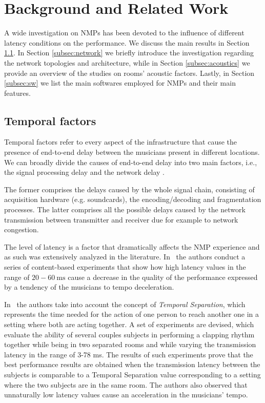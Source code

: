 \section{Background and Related Work}\label{sec:background}
A wide investigation on NMPs has been devoted to the influence of different latency conditions on the performance. We discuss the main results in Section \ref{subsec:temporal}. In Section \ref{subsec:network} we briefly introduce the investigation regarding the network topologies and architecture, while in Section \ref{subsec:acoustics} we provide an overview of the studies on rooms' acoustic factors. Lastly, in Section \ref{subsec:sw} we list the main softwares employed for NMPs and their main features.

\subsection{Temporal factors}\label{subsec:temporal}
Temporal factors refer to every aspect of the infrastructure that cause the presence of end-to-end delay between the musicians present in different locations. We can broadly divide the causes of end-to-end delay into two main factors, i.e., the signal processing delay and the network delay \cite{Lakiotakis}. 

The former comprises the delays caused by the whole signal chain, consisting of acquisition hardware (e.g. soundcards), the encoding/decoding and fragmentation processes. The latter comprises all the possible delays caused by the network transmission between transmitter and receiver due for example to network congestion.

The level of latency is a factor that dramatically affects the NMP experience and as such was extensively analyzed in the literature. In~\cite{RottondiFeature} the authors conduct a series of content-based experiments that show how high latency values in the range of $20-60~\mathrm{ms}$ cause a decrease in the quality of the performance expressed by a tendency of the musicians to tempo deceleration. 

In~\cite{Chafe1,Chafe2,Chafe3} the authors take into account the concept of \textit{Temporal Separation}, which represents the time needed for the action of one person to reach another one in a setting where both are acting together. A set of experiments are devised, which evaluate the ability of several couples subjects in performing a clapping rhythm together while being in two separated rooms and while varying the transmission latency in the range of 3-78 ms. The results of such experiments prove that the best performance results are obtained when the transmission latency between the subjects is comparable to a Temporal Separation value corresponding to a setting where the two subjects are in the same room. The authors also observed that unnaturally low latency values cause an acceleration in the musicians' tempo.

